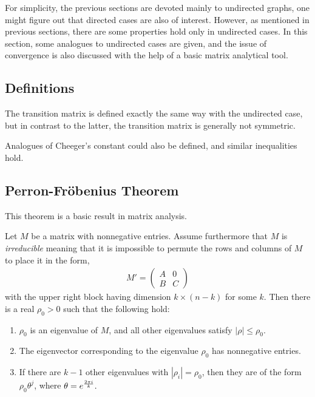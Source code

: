 For simplicity, the previous sections are devoted mainly to
undirected graphs, one might figure out that directed cases are also
of interest. However, as mentioned in previous sections, there are
some properties hold only in undirected cases. In this section, some
analogues to undirected cases are given, and the issue of
convergence is also discussed with the help of a basic matrix
analytical tool.

\subsection{Definitions}
The transition matrix is defined exactly the same way with the
undirected case, but in contrast to the latter, the transition
matrix is generally not symmetric.

Analogues of Cheeger's constant could also be defined, and similar inequalities
hold.

\subsection{Perron-Fr\"obenius Theorem}
This theorem is a basic result in matrix analysis.

\begin{theorem}
Let $M$ be a matrix with nonnegative entries. Assume furthermore that $M$ is
\emph{irreducible} meaning that it is impossible to permute the rows and columns of
$M$ to place it in the form,
\begin{eqnarray*}
M'=\left(
\begin{array}{cc}
A & 0\\
B & C
\end{array}
\right)
\end{eqnarray*}
with the upper right block having dimension $k\times (n-k)$ for some $k$. Then there
is a real $\rho_0>0$ such that the following hold:
\begin{enumerate}%
\item $\rho_0$ is an eigenvalue of $M$, and all other eigenvalues satisfy $|\rho|\le
\rho_0$.
\item The eigenvector corresponding to the eigenvalue $\rho_0$ has nonnegative
entries.
\item If there are $k-1$ other eigenvalues with $|\rho_i|=\rho_0$, then they are of
the form $\rho_0\theta^j$, where $\theta=e^{2\pi i\over k}.$
\end{enumerate}

\end{theorem}

